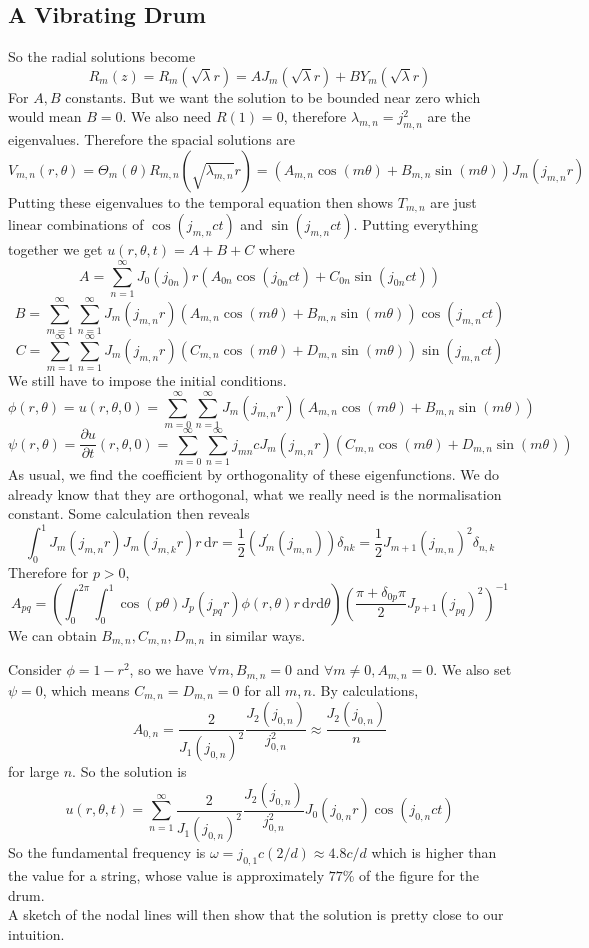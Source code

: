 \subsection{A Vibrating Drum}
So the radial solutions become
$$R_m(z)=R_m(\sqrt{\lambda}r)=AJ_m(\sqrt{\lambda}r)+BY_m(\sqrt{\lambda} r)$$
For $A,B$ constants.
But we want the solution to be bounded near zero which would mean $B=0$.
We also need $R(1)=0$, therefore $\lambda_{m,n}=j_{m,n}^2$ are the eigenvalues.
Therefore the spacial solutions are
$$V_{m,n}(r,\theta)=\Theta_m(\theta)R_{m,n}(\sqrt{\lambda_{m,n}}r)=(A_{m,n}\cos(m\theta)+B_{m,n}\sin(m\theta))J_m(j_{m,n}r)$$
Putting these eigenvalues to the temporal equation then shows $T_{m,n}$ are just linear combinations of $\cos(j_{m,n}ct)$ and $\sin(j_{m,n}ct)$.
Putting everything together we get $u(r,\theta,t)=A+B+C$ where
$$A=\sum_{n=1}^\infty J_0(j_{0n})r(A_{0n}\cos(j_{0n}ct)+C_{0n}\sin(j_{0n}ct))$$
$$B=\sum_{m=1}^\infty\sum_{n=1}^\infty J_m(j_{m,n}r)(A_{m,n}\cos(m\theta)+B_{m,n}\sin(m\theta))\cos(j_{m,n}ct)$$
$$C=\sum_{m=1}^\infty\sum_{n=1}^\infty J_m(j_{m,n}r)(C_{m,n}\cos(m\theta)+D_{m,n}\sin(m\theta))\sin(j_{m,n}ct)$$
We still have to impose the initial conditions.
$$\phi(r,\theta)=u(r,\theta,0)=\sum_{m=0}^\infty\sum_{n=1}^\infty J_m(j_{m,n}r)(A_{m,n}\cos(m\theta)+B_{m,n}\sin(m\theta))$$
$$\psi(r,\theta)=\frac{\partial u}{\partial t}(r,\theta,0)=\sum_{m=0}^\infty\sum_{n=1}^\infty j_{mn}cJ_m(j_{m,n}r)(C_{m,n}\cos(m\theta)+D_{m,n}\sin(m\theta))$$
As usual, we find the coefficient by orthogonality of these eigenfunctions.
We do already know that they are orthogonal, what we really need is the normalisation constant.
Some calculation then reveals
$$\int_0^1J_m(j_{m,n}r)J_m(j_{m,k}r)r\,\mathrm dr=\frac{1}{2}(J_m^\prime(j_{m,n}))\delta_{nk}=\frac{1}{2}J_{m+1}(j_{m,n})^2\delta_{n,k}$$
Therefore for $p>0$,
$$A_{pq}=\left(\int_0^{2\pi}\int_0^1\cos(p\theta)J_p(j_{pq}r)\phi(r,\theta)r\,\mathrm dr\mathrm d\theta\right)\left( \frac{\pi+\delta_{0p}\pi}{2}J_{p+1}(j_{pq})^2 \right)^{-1}$$
We can obtain $B_{m,n},C_{m,n},D_{m,n}$ in similar ways.
\begin{example}
    Consider $\phi=1-r^2$, so we have $\forall m,B_{m,n}=0$ and $\forall m\neq 0,A_{m,n}=0$.
    We also set $\psi=0$, which means $C_{m,n}=D_{m,n}=0$ for all $m,n$.
    By calculations,
    $$A_{0,n}=\frac{2}{J_1(j_{0,n})^2}\frac{J_2(j_{0,n})}{j_{0,n}^2}\approx\frac{J_2(j_{0,n})}{n}$$
    for large $n$.
    So the solution is
    $$u(r,\theta,t)=\sum_{n=1}^\infty\frac{2}{J_1(j_{0,n})^2}\frac{J_2(j_{0,n})}{j_{0,n}^2}J_0(j_{0,n}r)\cos(j_{0,n}ct)$$
    So the fundamental frequency is $\omega=j_{0,1}c(2/d)\approx 4.8c/d$ which is higher than the value for a string, whose value is approximately $77\%$ of the figure for the drum.\\
    A sketch of the nodal lines will then show that the solution is pretty close to our intuition.
\end{example}